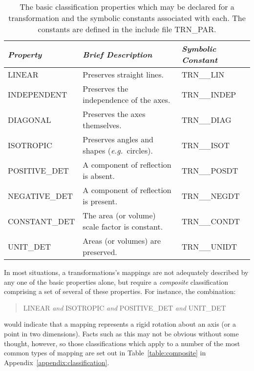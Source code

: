 \documentclass[twoside,nolof,11pt]{starlink}
\providecommand{\name}[1]{\small{#1}}
\begin{document}
\begin{table}[h]
\begin{center}

\begin{tabular}{|l|l|l|}
\hline
\emph{Property} & \emph{Brief Description} & \emph{Symbolic Constant}
\\ \hline
LINEAR & Preserves straight lines. & TRN\_\_LIN \\
INDEPENDENT & Preserves the independence of the axes. & TRN\_\_INDEP \\
DIAGONAL & Preserves the axes themselves. & TRN\_\_DIAG \\
ISOTROPIC & Preserves angles and shapes (\emph{e.g.}\ circles). & TRN\_\_ISOT \\
POSITIVE\_DET & A component of reflection is absent. & TRN\_\_POSDT \\
NEGATIVE\_DET & A component of reflection is present. & TRN\_\_NEGDT \\
CONSTANT\_DET & The area (or volume) scale factor is constant. & TRN\_\_CONDT \\
UNIT\_DET & Areas (or volumes) are preserved. & TRN\_\_UNIDT \\
\hline
\end{tabular}
\end{center}
\caption[Constants]{The basic classification properties which may be declared for a
transformation and the symbolic constants associated with each.
The constants are defined in the include file \name{TRN\_PAR}.}

\label{table:classification}


\end{table}

In most situations, a transformations's mappings are not adequately
described by any one of the basic properties alone, but require a
\emph{composite} classification comprising a set of several of these
properties.  For instance, the combination:

\begin{quote}
\begin{center}

\name{LINEAR} \emph{and} \name{ISOTROPIC} \emph{and} \name{POSITIVE\_DET}
\emph{and} \name{UNIT\_DET}

\end{center}
\end{quote}

would indicate that a mapping represents a rigid rotation about an axis (or a
point in two dimensions).
Facts such as this may not be obvious without some thought, however, so
those classifications which apply to a number of the most common types of
mapping are set out in Table~\ref{table:composite} in
Appendix~\ref{appendix:classification}.
\end{document}
